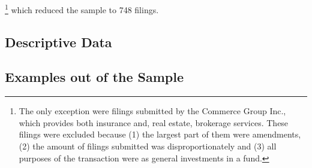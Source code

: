 \documentclass[12pt]{article}
\begin{document}
\footnote{The only exception were filings submitted by the Commerce Group Inc., which provides both insurance and, real estate, brokerage services. These filings were excluded because (1) the largest part of them were amendments, (2) the amount of filings submitted was disproportionately and (3) all purposes of the transaction were as general investments in a fund.}
which reduced the sample to 748 filings. 

\subsection{Descriptive Data}

\subsection{Examples out of the Sample}

\pagebreak
\end{document}
